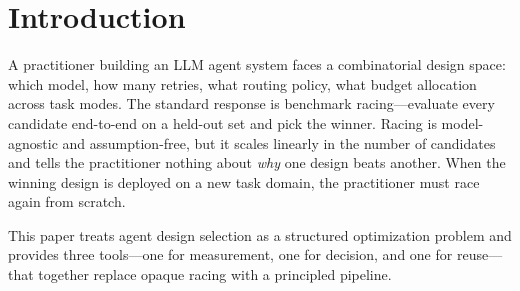 
\begin{abstract}
Selecting among compound LLM agent designs today reduces to benchmark
racing: run every candidate end-to-end and pick the winner.
This approach conflates cost, model competence, routing quality, and
task structure into a single opaque score.
We prove an exact four-term identity that decomposes the performance gap
between any two designs into these four factors, yielding a closed-form
crossover depth $D_{\mathrm{cross}} = \log(1-p_l)/\log(1-p_s)$ at which a
cheap model with retries overtakes an expensive one.
Building on this decomposition, we give a design-selection algorithm
whose evaluation cost is independent of the number of candidate designs:
at $k{=}500$ candidates it uses $33\times$ fewer evaluations than racing.
For reusing designs across task domains, we derive a three-case transfer
rule---plug-and-play, re-route, or start over---with explicit thresholds
determined by two formally independent notions of task equivalence.
The transfer rule is conservative: its worst-case decision accuracy is
73.8\%.
\end{abstract}

\section{Introduction}
\label{sec:intro}

A practitioner building an LLM agent system faces a combinatorial design
space: which model, how many retries, what routing policy, what budget
allocation across task modes.  The standard response is benchmark
racing---evaluate every candidate end-to-end on a held-out set and pick the
winner.  Racing is model-agnostic and assumption-free, but it scales
linearly in the number of candidates and tells the practitioner nothing
about \emph{why} one design beats another.  When the winning design is
deployed on a new task domain, the practitioner must race again from
scratch.

This paper treats agent design selection as a structured optimization
problem and provides three tools---one for measurement, one for decision,
and one for reuse---that together replace opaque racing with a principled
pipeline.

